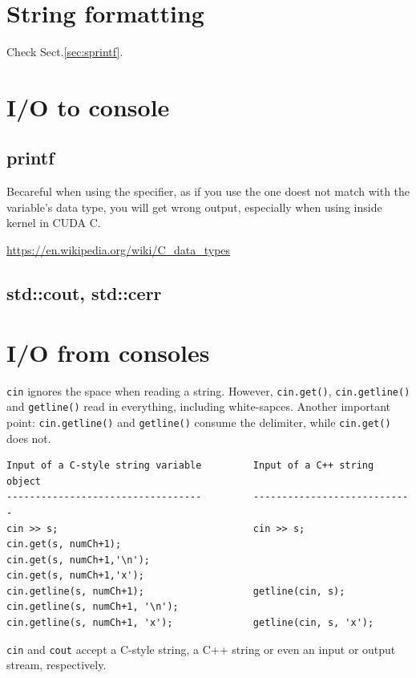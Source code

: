 \section{String formatting}

Check Sect.\ref{sec:sprintf}.

\section{I/O to console}

\subsection{printf}
\label{sec:printf}

Becareful when using the specifier, as if you use the one doest not match with
the variable's data type, you will get wrong output, especially when using
inside kernel in CUDA C.

\url{https://en.wikipedia.org/wiki/C_data_types}

\subsection{std::cout, std::cerr}



\section{I/O from consoles}
\label{sec:IO_console}

\verb!cin! ignores the space when reading a string. However, \verb!cin.get()!,
\verb!cin.getline()! and \verb!getline()! read in everything, including
white-sapces. Another important point: \verb!cin.getline()! and \verb!getline()!
consume the delimiter, while \verb!cin.get()! does not. 

\begin{verbatim}
Input of a C-style string variable         Input of a C++ string object
----------------------------------         ----------------------------
cin >> s;                                  cin >> s;
cin.get(s, numCh+1);
cin.get(s, numCh+1,'\n');
cin.get(s, numCh+1,'x');
cin.getline(s, numCh+1);                   getline(cin, s);
cin.getline(s, numCh+1, '\n');
cin.getline(s, numCh+1, 'x');              getline(cin, s, 'x');
\end{verbatim}
\verb!cin! and \verb!cout! accept a C-style string, a C++ string or even an
input or output stream, respectively.

